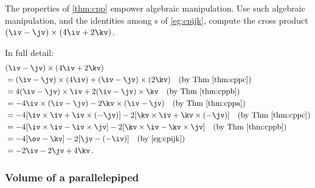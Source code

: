 \begin{example} \label{eg:}
The properties of \autoref{thm:cpp} empower algebraic manipulation.
Use such algebraic manipulation, and the identities among s of \autoref{eg:cpijk}, compute the cross product \((\iv-\jv)\times(4\iv+2\kv)\).
\begin{solution} In full detail:
\begin{align*}
&(\iv-\jv)\times(4\iv+2\kv)
\\&=(\iv-\jv)\times(4\iv)+(\iv-\jv)\times(2\kv) 
\quad(\text{by Thm~\ref{thm:cppc}})
\\&=4(\iv-\jv)\times\iv+2(\iv-\jv)\times\kv
\quad(\text{by Thm~\ref{thm:cppb}})
\\&=-4\iv\times(\iv-\jv)-2\kv\times(\iv-\jv)
\quad(\text{by Thm~\ref{thm:cppa}})
\\&=-4[\iv\times\iv+\iv\times(-\jv)]-2[\kv\times\iv+\kv\times(-\jv)]
\quad(\text{by Thm~\ref{thm:cppc}})
\\&=-4[\iv\times\iv-\iv\times\jv]-2[\kv\times\iv-\kv\times\jv]
\quad(\text{by Thm~\ref{thm:cppb}})
\\&=-4[\ov-\kv]-2[\jv-(-\iv)]
\quad(\text{by \autoref{eg:cpijk}})
\\&=-2\iv-2\jv+4\kv\,.
\end{align*}
\end{solution}
\end{example}







\subsubsection{Volume of a parallelepiped}

\newcommand{\pppd}[1]{%
\qview{30}{34}{\begin{tikzpicture} 
\def\ua{0.5}\def\ub{0.5}\def\uc{1}
\def\va{2}\def\vb{0.5}\def\vc{0}
\def\wa{0.5}\def\wb{1.3}\def\wc{0}
\def\vw{1.7}
\begin{axis}[small,font=\footnotesize,axis equal,view={\q}{25}
    ,axis lines=none ]
    \addplot3[quiver={u=\ua,v=\ub,w=\uc},blue,-stealth,thick] 
    coordinates {(0,0,0)(\va,\vb,\vc)(\wa,\wb,\wc)(\va+\wa,\vb+\wb,\vc+\wc)};
    \node[below] at (axis cs:\ua,\ub,\uc) {$\vec u$};
    \addplot3[quiver={u=\va,v=\vb,w=\vc},blue,-stealth,thick] 
    coordinates {(0,0,0)(\ua,\ub,\uc)(\wa,\wb,\wc)(\ua+\wa,\ub+\wb,\uc+\wc)};
    \node[below] at (axis cs:\va,\vb,\vc) {$\vec v$};
    \addplot3[quiver={u=\wa,v=\wb,w=\wc},blue,-stealth,thick] 
    coordinates {(0,0,0)(\va,\vb,\vc)(\ua,\ub,\uc)(\va+\ua,\vb+\ub,\vc+\uc)};
    \node[below] at (axis cs:\wa,\wb,\wc) {$\vec w$};
  \ifnum0<#1
    \addplot3[quiver={u=0,v=0,w=\vw},red,-stealth,thick] 
    coordinates {(0,0,0)};
    \node[right] at (axis cs:0,0,\vw) {$\vec v\times\vec w$};
    \node[right] at (axis cs:0,0,0.5) {$\!\theta$};
    \addplot3[gray] coordinates {(0,0,\uc)(\ua,\ub,\uc)};
  \fi
\end{axis}
\end{tikzpicture}
}}

